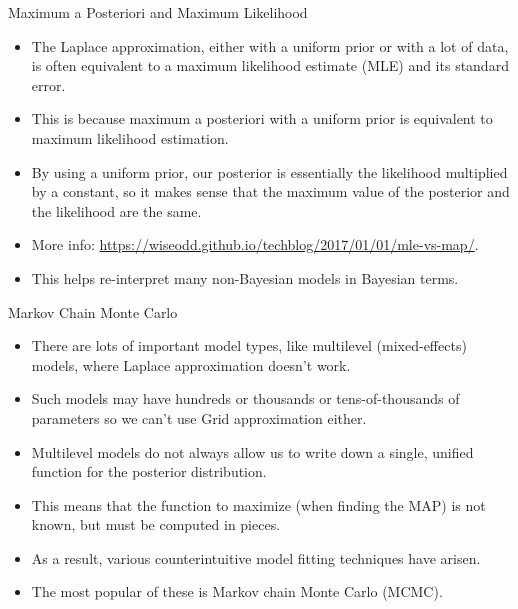 \documentclass[handout]{beamer}
\begin{document}
\begin{frame}{Maximum a Posteriori and Maximum Likelihood}
\scriptsize{

\begin{itemize}
\item The Laplace approximation, either with a uniform prior or with a lot of data, is often equivalent to a maximum likelihood estimate (MLE) and its standard error.
\item This is because maximum a posteriori with a uniform prior is equivalent to maximum likelihood estimation.
\item By using a uniform prior, our posterior is essentially the likelihood multiplied by a constant, so it makes sense that the maximum value of the posterior and the likelihood are the same.
\item More info: \url{https://wiseodd.github.io/techblog/2017/01/01/mle-vs-map/}.
\item This helps re-interpret many non-Bayesian models in Bayesian terms.
\end{itemize}


} 
\end{frame}



\begin{frame}{Markov Chain Monte Carlo}
\scriptsize{

\begin{itemize}
\item There are lots of important model types, like multilevel (mixed-effects) models, where Laplace approximation doesn't work.
\item Such models may have hundreds or thousands or tens-of-thousands of parameters so we can't use Grid approximation either.
\item Multilevel models do not always allow us to write down a single, unified function for the posterior distribution.
\item This means that the function to maximize (when finding the MAP) is not known, but must be computed in pieces. 
\item As a result, various counterintuitive model fitting techniques have arisen. 
\item The most popular of these is Markov chain Monte Carlo (MCMC).
\end{itemize}


} 
\end{frame}
\end{document}
